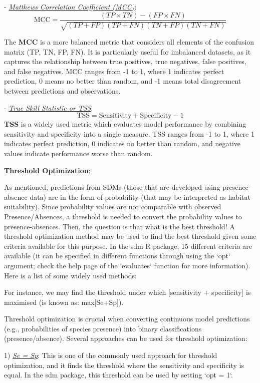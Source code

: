 \documentclass[
]{article}
\begin{document}
\begin{mdframed}[backgroundcolor=gray!10, linecolor=black!75, linewidth=2pt, roundcorner=5pt, shadow=true,frametitle={\textbf{BOX 2: \uline{Model evaluations for SDMs}}}]
- \uline{\textit{Matthews Correlation Coefficient (MCC)}}:
  \[
  \text{MCC} = \frac{(TP \times TN) - (FP \times FN)}{\sqrt{(TP + FP)(TP + FN)(TN + FP)(TN + FN)}}
  \]

The \textbf{MCC} is a more balanced metric that considers all elements of the confusion matrix (TP, TN, FP, FN). It is particularly useful for imbalanced datasets, as it captures the relationship between true positives, true negatives, false positives, and false negatives. MCC ranges from -1 to 1, where 1 indicates perfect prediction, 0 means no better than random, and -1 means total disagreement between predictions and observations.

- \uline{\textit{True Skill Statistic or TSS}}:
  \[
  \text{TSS} = \text{Sensitivity} + \text{Specificity} - 1
  \]
    \textbf{TSS} is a widely used metric which evaluates model performance by combining sensitivity and specificity into a single measure. TSS ranges from -1 to 1, where 1 indicates perfect prediction, 0 indicates no better than random, and negative values indicate performance worse than random.


\textbf{Threshold Optimization}:

As mentioned, predictions from SDMs (those that are developed using presence-absence data) are in the form of probability (that may be interpreted as habitat suitability). Since probability values are not comparable with observed Presence/Absences, a threshold is needed to convert the probability values to presence-absences. Then, the question is that what is the best threshold! A threshold optimization method may be used to find the best threshold given some criteria available for this purpose. In the sdm R package, 15 different criteria are available (it can be specified in different functions through using the `opt` argument; check the help page of the `evaluates` function for more information). Here is a list of some widely used methods: 

For instance, we may find the threshold under which [sensitivity + specificity] is maximised (is known as: max[Se+Sp]).

Threshold optimization is crucial when converting continuous model predictions (e.g., probabilities of species presence) into binary classifications (presence/absence). Several approaches can be used for threshold optimization:

1) \uline{\textit{Se = Sp}}: This is one of the commonly used approach for threshold optimization, and it finds  the threshold where the sensitivity and specificity is equal. In the sdm package, this threshold can be used by setting `opt = 1`.


\end{mdframed}
\end{document}
